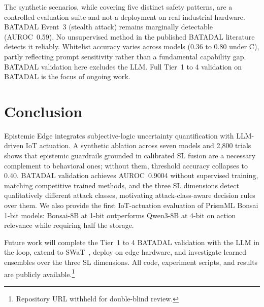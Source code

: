 \documentclass[conference]{IEEEtran}
\begin{document}
The synthetic scenarios, while covering five distinct safety patterns, are a controlled evaluation suite and not a deployment on real industrial hardware.
BATADAL Event~3 (stealth attack) remains marginally detectable (AUROC~0.59). No unsupervised method in the published BATADAL literature detects it reliably.
Whitelist accuracy varies across models (0.36 to 0.80 under C), partly reflecting prompt sensitivity rather than a fundamental capability gap.
BATADAL validation here excludes the LLM. Full Tier~1 to 4 validation on BATADAL is the focus of ongoing work.

\section{Conclusion}

Epistemic Edge integrates subjective-logic uncertainty quantification with LLM-driven IoT actuation. A synthetic ablation across seven models and 2{,}800 trials shows that epistemic guardrails grounded in calibrated SL fusion are a necessary complement to behavioral ones; without them, threshold accuracy collapses to 0.40. BATADAL validation achieves AUROC~0.9004 without supervised training, matching competitive trained methods, and the three SL dimensions detect qualitatively different attack classes, motivating attack-class-aware decision rules over them. We also provide the first IoT-actuation evaluation of PrismML Bonsai 1-bit models: Bonsai-8B at 1-bit outperforms Qwen3-8B at 4-bit on action relevance while requiring half the storage.

Future work will complete the Tier~1 to 4 BATADAL validation with the LLM in the loop, extend to SWaT~\cite{goh2017swat}, deploy on edge hardware, and investigate learned ensembles over the three SL dimensions. All code, experiment scripts, and results are publicly available.\footnote{Repository URL withheld for double-blind review.}

\balance


\end{document}

